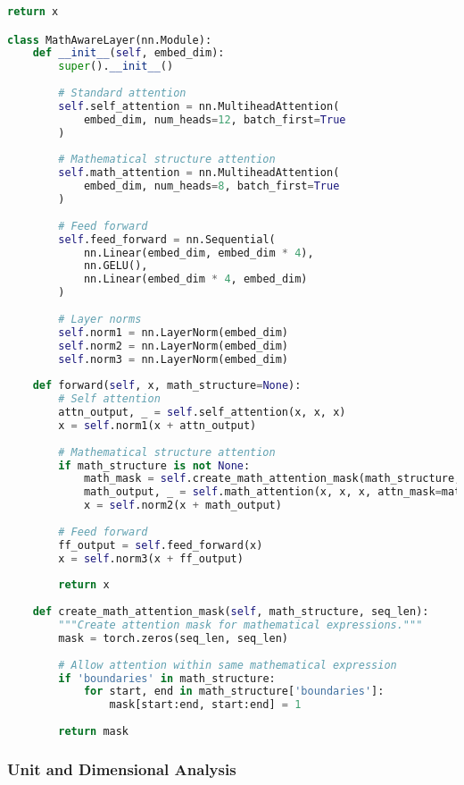 \begin{lstlisting}[language=Python, caption=Mathematical formula tokenization system]
        return x

class MathAwareLayer(nn.Module):
    def __init__(self, embed_dim):
        super().__init__()
        
        # Standard attention
        self.self_attention = nn.MultiheadAttention(
            embed_dim, num_heads=12, batch_first=True
        )
        
        # Mathematical structure attention
        self.math_attention = nn.MultiheadAttention(
            embed_dim, num_heads=8, batch_first=True
        )
        
        # Feed forward
        self.feed_forward = nn.Sequential(
            nn.Linear(embed_dim, embed_dim * 4),
            nn.GELU(),
            nn.Linear(embed_dim * 4, embed_dim)
        )
        
        # Layer norms
        self.norm1 = nn.LayerNorm(embed_dim)
        self.norm2 = nn.LayerNorm(embed_dim)
        self.norm3 = nn.LayerNorm(embed_dim)
        
    def forward(self, x, math_structure=None):
        # Self attention
        attn_output, _ = self.self_attention(x, x, x)
        x = self.norm1(x + attn_output)
        
        # Mathematical structure attention
        if math_structure is not None:
            math_mask = self.create_math_attention_mask(math_structure, x.size(1))
            math_output, _ = self.math_attention(x, x, x, attn_mask=math_mask)
            x = self.norm2(x + math_output)
        
        # Feed forward
        ff_output = self.feed_forward(x)
        x = self.norm3(x + ff_output)
        
        return x
    
    def create_math_attention_mask(self, math_structure, seq_len):
        """Create attention mask for mathematical expressions."""
        mask = torch.zeros(seq_len, seq_len)
        
        # Allow attention within same mathematical expression
        if 'boundaries' in math_structure:
            for start, end in math_structure['boundaries']:
                mask[start:end, start:end] = 1
        
        return mask
\end{lstlisting}

\subsubsection{Unit and Dimensional Analysis}

